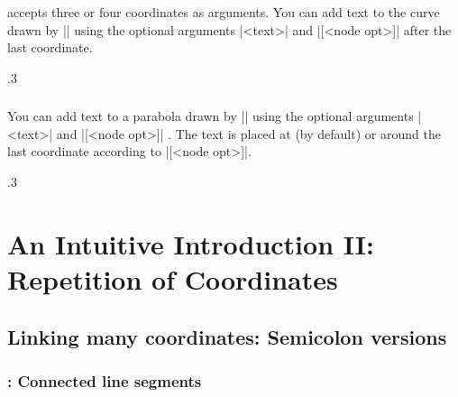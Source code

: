 \icmd{\tzbezier} accepts three or four coordinates as arguments.
You can add text to the curve drawn by |\tzbezier| using the optional arguments |{<text>}| and |[<node opt>]| after the last coordinate.

\begin{tzcode}{.3}
\end{tzcode}


\subsection{\protect\cmd{\tzparabola}}
\label{ssi:texttotzparabola}

You can add text to a parabola drawn by |\tzparabola| using the optional arguments |{<text>}| and |[<node opt>]| .
The text is placed at (by default) or around the last coordinate according to |[<node opt>]|.


\begin{tzcode}{.3}
\end{tzcode}


\chapter{An Intuitive Introduction II: Repetition of Coordinates}
\label{ci:introII}

\section{Linking many coordinates: Semicolon versions}
\label{si:liknmanycoordinates}

\subsection{\protect\cmd{\tzlines}: Connected line segments}
\label{ssi:tzlines}

